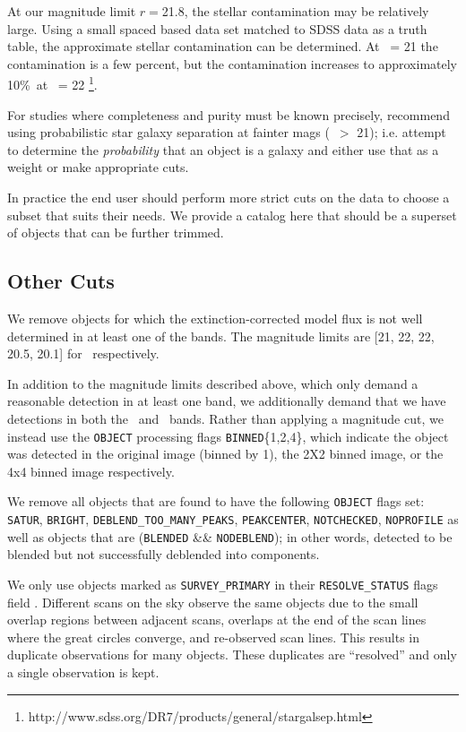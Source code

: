 \documentclass[preprint]{aastex}
\newcommand{\rmax}{21.8}
\newcommand{\contamworst}{10\%}
\begin{document}
At our magnitude limit $r = $\rmax, the stellar contamination may be relatively
large.  Using a small spaced based data set matched to SDSS data as a truth
table, the approximate stellar contamination can be determined.  At \rmag\ = 21
the contamination is a few percent, but the contamination increases to
approximately \contamworst\ at \rmag\ = 22
\footnote{http://www.sdss.org/DR7/products/general/stargalsep.html}.  


For studies where completeness and purity must be known precisely,
\citet{ScrantonMag05} recommend using probabilistic star galaxy separation at
fainter mags (\rmag\ $ > $ 21); i.e.  attempt to determine the {\it
probability} that an object is a galaxy and either use that as a weight or make
appropriate cuts. 


In practice the end user should perform more strict cuts on the data to choose
a subset that suits their needs.  We provide a catalog here that should be a
superset of objects that can be further trimmed.

\subsection{Other Cuts}

We remove objects for which the extinction-corrected model flux is not well
determined in at least one of the bands.  The magnitude limits are [21, 22, 22,
20.5, 20.1] for \allmag\ respectively.

In addition to the magnitude limits described above, which only demand a
reasonable detection in at least one band, we additionally demand that we have
detections in both the \rmag\ and \imag\ bands.  Rather than applying a
magnitude cut, we instead use the \texttt{OBJECT} processing flags
\texttt{BINNED}\{1,2,4\}, which indicate the object was detected in the original
image (binned by 1), the 2X2 binned image, or the 4x4 binned image respectively.

We remove all objects that are found to have the following \texttt{OBJECT}
flags set: \texttt{SATUR}, \texttt{BRIGHT}, \texttt{DEBLEND\_TOO\_MANY\_PEAKS},
\texttt{PEAKCENTER}, \texttt{NOTCHECKED}, \texttt{NOPROFILE} as well as objects
that are (\texttt{BLENDED} \&\& \texttt{NODEBLEND}); in other words, detected
to be blended but not successfully deblended into components. 

We only use objects marked as \texttt{SURVEY\_PRIMARY} in their
\texttt{RESOLVE\_STATUS} flags field \citep{dr7resolve}. Different scans on the
sky observe the same objects due to the small overlap regions between adjacent
scans, overlaps at the end of the scan lines where the great circles converge,
and re-observed scan lines.  This results in duplicate observations for many
objects.  These duplicates are ``resolved'' and only a single observation is
kept.
\end{document}
